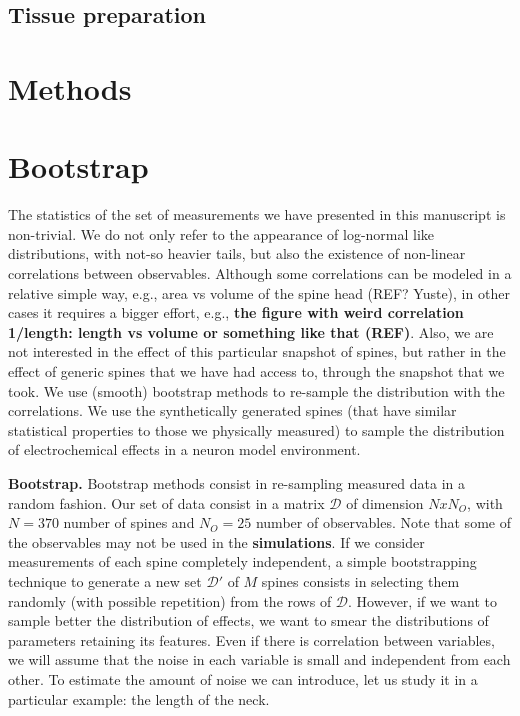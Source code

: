 \documentclass[10pt,letterpaper]{article}
\begin{document}
\subsection*{Tissue preparation}

\appendix
\section{Methods}

\section{Bootstrap}
The statistics of the set of measurements we have presented in this manuscript is non-trivial. We do not only refer to the appearance of log-normal like distributions, with not-so heavier tails, but also the existence of non-linear correlations between observables. Although some correlations can be modeled in a relative simple way, e.g., area vs volume of the spine head (REF? Yuste), in other cases it requires a bigger effort, e.g., {\bf the figure with weird correlation 1/length: length vs volume or something like that (REF)}. Also, we are not interested in the effect of this particular snapshot of spines, but rather in the effect of generic spines that we have had access to, through the snapshot that we took. We use (smooth) bootstrap methods to re-sample the distribution with the correlations. We use the synthetically generated spines (that have similar statistical properties to those we physically measured) to sample the distribution of electrochemical effects in a neuron model environment.

{\bf Bootstrap.} Bootstrap methods consist in re-sampling measured data in a random fashion. Our set of data consist in a matrix $\mathcal{D}$ of dimension $NxN_O$, with $N=370$ number of spines and $N_O = 25$ number of observables. Note that some of the observables may not be used in the {\bf simulations}. If we consider measurements of each spine completely independent, a simple bootstrapping technique to generate a new set $\mathcal{D}'$ of $M$ spines consists in selecting them randomly (with possible repetition) from the rows of $\mathcal{D}$. However, if we want to sample better the distribution of effects, we want to smear the distributions of parameters retaining its features. Even if there is correlation between variables, we will assume that the noise in each variable is small and independent from each other. To estimate the amount of noise we can introduce, let us study it in a particular example: the length of the neck. 
\end{document}
